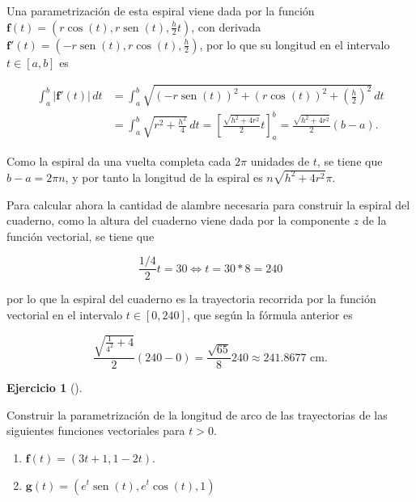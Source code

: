 \documentclass[
  spanish,
  a4paper,
]{scrreport}
\theoremstyle{definition}
\newtheorem{exercise}{Ejercicio}[chapter]
\theoremstyle{remark}
\begin{document}
\begin{tcolorbox}[enhanced jigsaw, arc=.35mm, bottomrule=.15mm, bottomtitle=1mm, breakable, colback=white, colbacktitle=quarto-callout-tip-color!10!white, colframe=quarto-callout-tip-color-frame, coltitle=black, left=2mm, leftrule=.75mm, opacityback=0, opacitybacktitle=0.6, rightrule=.15mm, title=\textcolor{quarto-callout-tip-color}{\faLightbulb}\hspace{0.5em}{Solución}, titlerule=0mm, toprule=.15mm, toptitle=1mm]

Una parametrización de esta espiral viene dada por la función
\(\mathbf{f}(t) = (r\cos(t),r\operatorname{sen}(t),\frac{h}{2}t)\), con
derivada
\(\mathbf{f}'(t) = (-r\operatorname{sen}(t),r\cos(t), \frac{h}{2})\),
por lo que su longitud en el intervalo \(t\in[a,b]\) es

\begin{align*}
\int_a^b |\mathbf{f}'(t)|\,dt 
&= \int_a^b \sqrt{(-r\operatorname{sen}(t))^2+(r\cos(t))^2+\left(\frac{h}{2}\right)^2}\, dt \\
&= \int_a^b \sqrt{r^2+\frac{h^2}{4}}\, dt 
= \left[\frac{\sqrt{h^2+4r^2}}{2}t\right]_a^b
= \frac{\sqrt{h^2+4r^2}}{2}(b-a).
\end{align*}

Como la espiral da una vuelta completa cada \(2\pi\) unidades de \(t\),
se tiene que \(b-a=2\pi n\), y por tanto la longitud de la espiral es
\(n\sqrt{h^2+4r^2}\pi\).

Para calcular ahora la cantidad de alambre necesaria para construir la
espiral del cuaderno, como la altura del cuaderno viene dada por la
componente \(z\) de la función vectorial, se tiene que

\[
\frac{1/4}{2}t = 30 \Leftrightarrow t = 30 * 8 = 240
\]

por lo que la espiral del cuaderno es la trayectoria recorrida por la
función vectorial en el intervalo \(t\in [0,240]\), que según la fórmula
anterior es

\[
\frac{\sqrt{\frac{1}{4^2}+4}}{2}(240-0) = \frac{\sqrt{65}}{8}240 \approx 241.8677 \mbox{ cm}. 
\]

\end{tcolorbox}

\begin{exercise}[]\protect\hypertarget{exr-parametrizacion-longitud-arco}{}\label{exr-parametrizacion-longitud-arco}

Construir la parametrización de la longitud de arco de las trayectorias
de las siguientes funciones vectoriales para \(t>0\).

\begin{enumerate}
\def\labelenumi{\alph{enumi}.}
\item
  \(\mathbf{f}(t)=(3t+1, 1-2t).\)
\item
  \(\mathbf{g}(t)=(e^t\operatorname{sen}(t), e^t\cos(t), 1)\)
\end{enumerate}

\end{exercise}
\end{document}
